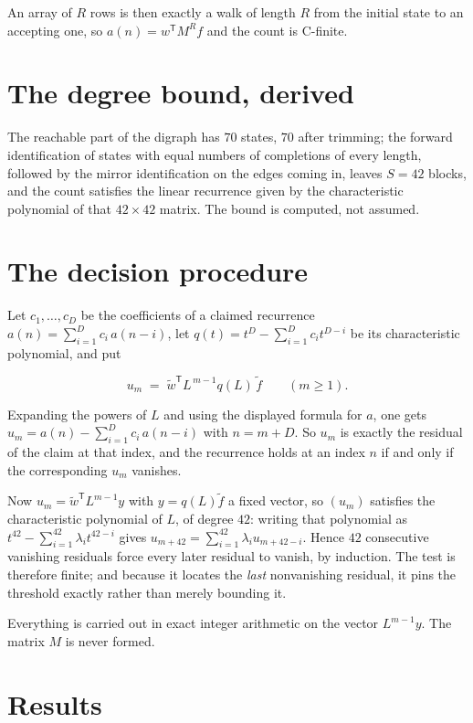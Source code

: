 \documentclass[11pt]{article}
\theoremstyle{definition}
\begin{document}
An array of $R$ rows is then exactly a walk of length $R$ from the initial state to an accepting one, so $a(n) = w^{\mathsf T}M^{R}f$ and the count is C-finite.

\section{The degree bound, derived}

The reachable part of the digraph has $70$ states, $70$ after trimming; the forward identification of states with equal numbers of completions of every length, followed by the mirror identification on the edges coming in, leaves $S = 42$ blocks, and the count satisfies the linear recurrence given by the characteristic polynomial of that $42\times42$ matrix. The bound is computed, not assumed.

\section{The decision procedure}

Let $c_1,\dots,c_D$ be the coefficients of a claimed recurrence $a(n) = \sum_{i=1}^{D} c_i\,a(n-i)$, let $q(t) = t^{D} - \sum_{i=1}^{D} c_i t^{D-i}$ be its characteristic polynomial, and put

\[u_m \;=\; \tilde w^{\mathsf T} L^{\,m-1} q(L)\,\tilde f \qquad (m \ge 1).\]

Expanding the powers of $L$ and using the displayed formula for $a$, one gets $u_m = a(n) - \sum_{i=1}^{D} c_i\,a(n-i)$ with $n = m + D$. So $u_m$ is exactly the residual of the claim at that index, and the recurrence holds at an index $n$ if and only if the corresponding $u_m$ vanishes.

Now $u_m = \tilde w^{\mathsf T} L^{m-1} y$ with $y = q(L)\tilde f$ a fixed vector, so $(u_m)$ satisfies the characteristic polynomial of $L$, of degree $42$: writing that polynomial as $t^{42} - \sum_{i=1}^{42} \lambda_i t^{42-i}$ gives $u_{m+42} = \sum_{i=1}^{42} \lambda_i u_{m+42-i}$. Hence $42$ consecutive vanishing residuals force every later residual to vanish, by induction. The test is therefore finite; and because it locates the {\itshape last} nonvanishing residual, it pins the threshold exactly rather than merely bounding it.

Everything is carried out in exact integer arithmetic on the vector $L^{m-1}y$. The matrix $M$ is never formed.

\section{Results}
\end{document}
